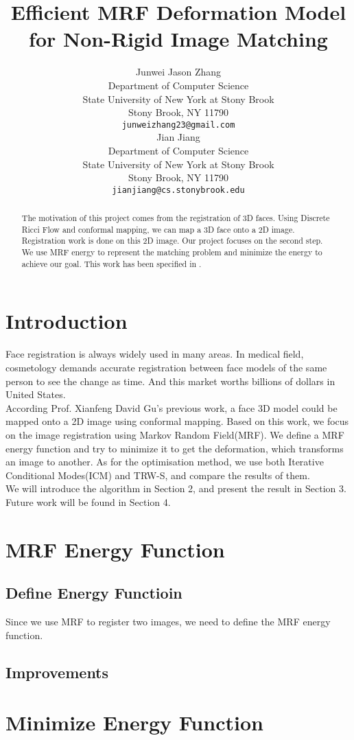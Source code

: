 \documentclass{article} %
\title{Efficient MRF Deformation Model for Non-Rigid Image Matching}
\author{
Junwei Jason Zhang\\
Department of Computer Science\\
State University of New York at Stony Brook\\
Stony Brook, NY 11790 \\
\texttt{junweizhang23@gmail.com} \\
\And
Jian Jiang \\
Department of Computer Science \\
State University of New York at Stony Brook \\
Stony Brook, NY 11790 \\
\texttt{jianjiang@cs.stonybrook.edu} \\
}
\begin{document}
\maketitle

\begin{abstract}
The motivation of this project comes from the registration of 3D faces. Using Discrete Ricci Flow and conformal mapping, we can map a 3D face onto a 2D image. Registration work is done on this 2D image. Our project focuses on the second step. We use MRF energy to represent the matching problem and minimize the energy to achieve our goal. This work has been specified in \cite{shekhovtsov2008efficient}.
\end{abstract}

\section{Introduction}

Face registration is always widely used in many areas. In medical field, cosmetology demands accurate registration between face models of the same person to see the change as time. And this market worths billions of dollars in United States. \\
According Prof. Xianfeng David Gu's previous work, a face 3D model could be mapped onto a 2D image using conformal mapping. Based on this work, we focus on the image registration using Markov Random Field(MRF). We define a MRF energy function and try to minimize it to get the deformation, which transforms an image to another. As for the optimisation method, we use both Iterative Conditional Modes(ICM) and TRW-S, and compare the results of them. \\
We will introduce the algorithm in Section 2, and present the result in Section 3. Future work will be found in Section 4.
\section{MRF Energy Function}
\label{MRF}
\subsection{Define Energy Functioin}
Since we use MRF to register two images, we need to define the MRF energy function.
\subsection{Improvements}
\section{Minimize Energy Function}
\end{document}
